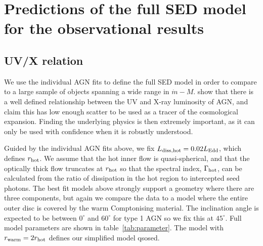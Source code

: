 \documentclass[a4paper,fleqn,usenatbib]{mnras}
\begin{document}
\section{Predictions of the full SED model for the observational results}
\subsection{UV/X relation}
\label{sec:uv-x}

We use the individual AGN fits to define the full SED model in order
to compare to a large sample of objects spanning a wide range in
$\dot{m}-M$. \cite{lusso2017} show that there is a well
defined relationship between the UV and X-ray luminosity of AGN, and
claim this has low enough scatter to be used as a tracer of the cosmological
expansion. Finding the underlying physics is then extremely important,
as it can only be used with confidence when it is robustly understood.

Guided by the individual AGN fits above, we fix 
$L_{\rm diss, hot}=0.02L_{\rm Edd}$, which defines $r_{\rm hot}$. We assume that the hot
inner flow is quasi-spherical, and that the optically thick flow
truncates at $r_{\rm hot}$ so that the spectral index, $\Gamma_{\rm hot}$, can
be calculated from the ratio of dissipation in the hot region to
intercepted seed photons. The best fit models above strongly support a
geometry where there are three components, but again we compare the
data to a model where the entire outer disc is covered by the warm
Comptonising material. 
The inclination angle is expected to be between $0^\circ$ and
$60^\circ$ for type 1 AGN so we fix this at $45^\circ$.
Full model parameters are shown in table~\ref{tab:parameter}. 
The model with $r_{\rm warm}=2r_{\rm hot}$ defines our simplified model {\sc qsosed}. 
\end{document}
